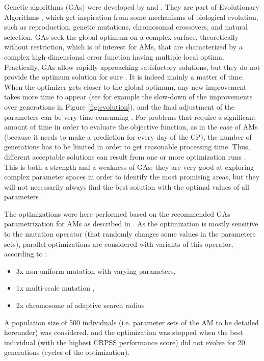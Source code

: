 \documentclass[review]{elsarticle}
\begin{document}
Genetic algorithms (GAs) were developed by \citet{Holland1992b} and \citet{Goldberg1989}. They are part of Evolutionary Algorithms \citep{Back1993b, Schwefel1993}, which get inspiration from some mechanisms of biological evolution, such as reproduction, genetic mutations, chromosomal crossovers, and natural selection. GAs seek the global optimum on a complex surface, theoretically without restriction, which is of interest for AMs, that are characterized by a complex high-dimensional error function having multiple local optima. Practically, GAs allow rapidly approaching satisfactory solutions, but they do not provide the optimum solution for sure \citep{Zitzler2004a}. It is indeed mainly a matter of time. When the optimizer gets closer to the global optimum, any new improvement takes more time to appear (see for example the slow-down of the improvements over generations in Figure \ref{fig:evolution}), and the final adjustment of the parameters can be very time consuming \citep{Back1993a}. For problems that require a significant amount of time in order to evaluate the objective function, as in the case of AMs (because it needs to make a prediction for every day of the CP), the number of generations has to be limited in order to get reasonable processing time. Thus, different acceptable solutions can result from one or more optimization runs \citep{Holland1992b}. This is both a strength and a weakness of GAs: they are very good at exploring complex parameter spaces in order to identify the most promising areas, but they will not necessarily always find the best solution with the optimal values of all parameters \citep{Holland1992b}.

The optimizations were here performed based on the recommended GAs parametrization for AMs as described in \citet{Horton2016}. As the optimization is mostly sensitive to the mutation operator (that randomly changes some values in the parameters sets), parallel optimizations are considered with variants of this operator, according to \citet{Horton2016}:

\begin{itemize}
	\item 3x non-uniform mutation \citep{Michalewicz1996} with varying parameters,
	\item 1x multi-scale mutation \citep{Horton2016},
	\item 2x chromosome of adaptive search radius \citep{Horton2016}
\end{itemize}

A population size of 500 individuals (i.e. parameter sets of the AM to be detailed hereunder) was considered, and the optimization was stopped when the best individual (with the highest CRPSS performance score) did not evolve for 20 generations (cycles of the optimization).
\end{document}
